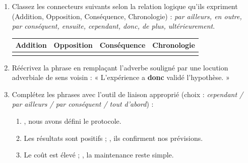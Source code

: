 \documentclass[11pt]{article}
\begin{document}
\begin{exercice}
\begin{enumerate}
    \item Classez les connecteurs suivants selon la relation logique qu'ils expriment (Addition, Opposition, Conséquence, Chronologie) : \textit{par ailleurs, en outre, par conséquent, ensuite, cependant, donc, de plus, ultérieurement}.
    \begin{center}
    \begin{tabular}{|l|l|l|l|}
    \hline
    Addition & Opposition & Conséquence & Chronologie \\
    \hline
    & & & \\
    \hline
    \end{tabular}
    \end{center}
    \item Réécrivez la phrase en remplaçant l'adverbe souligné par une locution adverbiale de sens voisin : « L'expérience a \textbf{donc} validé l'hypothèse. »
    \item Complétez les phrases avec l'outil de liaison approprié (choix : \textit{cependant / par ailleurs / par conséquent / tout d'abord}) :
    \begin{enumerate}
        \item \underline{\hspace{3cm}}, nous avons défini le protocole.
        \item Les résultats sont positifs ; \underline{\hspace{3cm}}, ils confirment nos prévisions.
        \item Le coût est élevé ; \underline{\hspace{3cm}}, la maintenance reste simple.
    \end{enumerate}
\end{enumerate}
\end{exercice}
\end{document}
